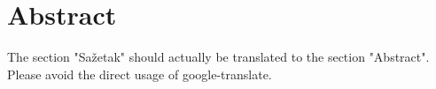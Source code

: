 \pagebreak

\section*{Abstract}

The section "Sažetak" should actually be translated to the section "Abstract". Please avoid the direct usage of google-translate.  

\vspace{1cm}

